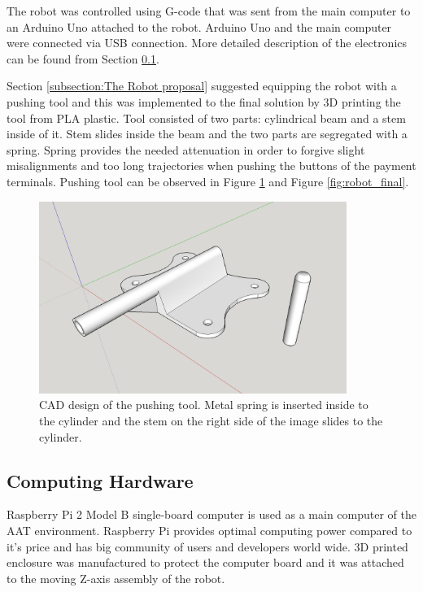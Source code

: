 The robot was controlled using G-code that was sent from the main computer to an Arduino Uno attached to the robot. Arduino Uno and the main computer were connected via USB connection. More detailed description of the electronics can be found from Section \ref{subsection:Computing hardware}.

Section \ref{subsection:The Robot proposal} suggested equipping the robot with a pushing tool and this was implemented to the final solution by 3D printing the tool from PLA plastic. Tool consisted of two parts: cylindrical beam and a stem inside of it. Stem slides inside the beam and the two parts are segregated with a spring. Spring provides the needed attenuation in order to forgive slight misalignments and too long trajectories when pushing the buttons of the payment terminals. Pushing tool can be observed in Figure \ref{fig:pushing_tool} and Figure \ref{fig:robot_final}.

\begin{figure}[ht]
  \begin{center}
    \includegraphics[width=10cm]{images/pushing_tool.png}
    \caption{CAD design of the pushing tool. Metal spring is inserted inside to the cylinder and the stem on the right side of the image slides to the cylinder.}
    \label{fig:pushing_tool}
  \end{center}
\end{figure}
\FloatBarrier

\subsection{Computing Hardware}
\label{subsection:Computing hardware}

Raspberry Pi 2 Model B single-board computer is used as a main computer of the AAT environment. Raspberry Pi provides optimal computing power compared to it's price and has big community of users and developers world wide. 3D printed enclosure was manufactured to protect the computer board and it was attached to the moving Z-axis assembly of the robot.

